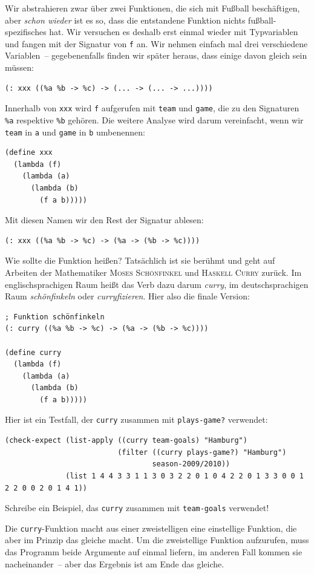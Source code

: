 Wir abstrahieren zwar über zwei Funktionen, die sich mit Fußball
beschäftigen, aber \emph{schon wieder} ist es so, dass die entstandene
Funktion nichts fußball-spezifisches hat.  Wir versuchen es deshalb
erst einmal wieder mit Typvariablen und fangen mit der Signatur von
\lstinline{f} an.  Wir nehmen einfach mal drei verschiedene
Variablen~-- gegebenenfalls finden wir später heraus, dass einige
davon gleich sein müssen:
%
\begin{lstlisting}
(: xxx ((%a %b -> %c) -> (... -> (... -> ...))))
\end{lstlisting}
%
Innerhalb von \lstinline{xxx} wird \lstinline{f} aufgerufen mit
\lstinline{team} und \lstinline{game}, die zu den Signaturen
\lstinline{%a} respektive \lstinline{%b} gehören.  Die weitere Analyse
wird darum vereinfacht, wenn wir \lstinline{team} in \lstinline{a} und
\lstinline{game} in \lstinline{b} umbenennen:
%
\begin{lstlisting}
(define xxx
  (lambda (f)
    (lambda (a)
      (lambda (b)
        (f a b)))))
\end{lstlisting}
%
Mit diesen Namen wir den Rest der Signatur ablesen:
%
\begin{lstlisting}
(: xxx ((%a %b -> %c) -> (%a -> (%b -> %c))))
\end{lstlisting}
%
Wie sollte die Funktion heißen?  Tatsächlich ist sie berühmt und geht
auf Arbeiten der Mathematiker \textsc{Moses Schönfinkel} und
\textsc{Haskell Curry} zurück.  Im englischsprachigen Raum heißt das
Verb dazu darum \textit{curry}, im deutschsprachigen Raum
\textit{schönfinkeln} oder
\textit{curryfizieren}.  Hier also die finale
Version:
%
\begin{lstlisting}
; Funktion schönfinkeln
(: curry ((%a %b -> %c) -> (%a -> (%b -> %c))))

(define curry
  (lambda (f)
    (lambda (a)
      (lambda (b)
        (f a b)))))
\end{lstlisting}
%
Hier ist ein Testfall, der \lstinline{curry} zusammen mit
\lstinline{plays-game?} verwendet:
%
\begin{lstlisting}
(check-expect (list-apply ((curry team-goals) "Hamburg")
                          (filter ((curry plays-game?) "Hamburg")
                                  season-2009/2010))
              (list 1 4 4 3 3 1 1 3 0 3 2 2 0 1 0 4 2 2 0 1 3 3 0 0 1 2 2 0 0 2 0 1 4 1))
\end{lstlisting}
%
\begin{aufgabeinline}
  Schreibe ein Beispiel, das \lstinline{curry} zusammen mit
  \lstinline{team-goals} verwendet!
\end{aufgabeinline}
%
Die \lstinline{curry}-Funktion macht aus einer zweistelligen eine
einstellige Funktion, die aber im Prinzip das gleiche macht. Um die
zweistellige Funktion aufzurufen, muss das Programm beide Argumente
auf einmal liefern, im anderen Fall kommen sie nacheinander~-- aber
das Ergebnis ist am Ende das gleiche.


